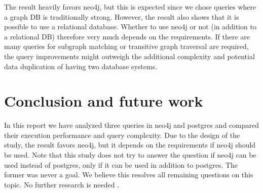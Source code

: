 \documentclass[11pt, a4paper,oneside,chapterprefix=false]{scrbook}
\begin{document}
The result heavily favors neo4j, but this is expected since we chose queries where a graph DB is traditionally strong.
However, the result also shows that it is possible to use a relational database.
Whether to use neo4j or not (in addition to a relational DB) therefore very much depends on the requirements.
If there are many queries for subgraph matching or transitive graph traversal are required, the query improvements might outweigh the additional complexity and potential data duplication of having two database systems.

\chapter{Conclusion and future work} \label{chp:conclusion}

In this report we have analyzed three queries in neo4j and postgres and compared their execution performance and query complexity. 
Due to the design of the study, the result favors neo4j, but it depends on the requirements if neo4j should be used.
Note that this study does not try to answer the question if neo4j can be used instead of postgres, only if it can be used in addition to postgres. The former was never a goal.
We believe this resolves all remaining questions on this topic. No further research is needed \cite{xkcdresearch}.


\end{document}
